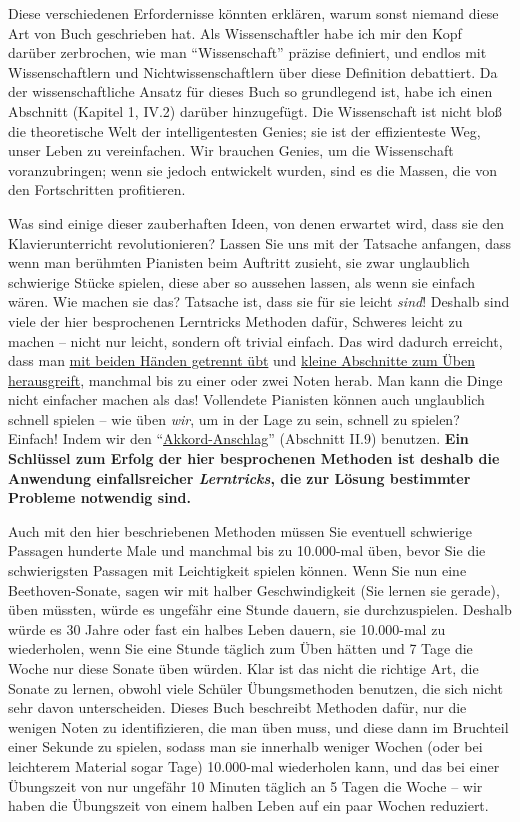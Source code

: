 Diese verschiedenen Erfordernisse könnten erklären, warum sonst niemand diese Art von Buch geschrieben hat.
Als Wissenschaftler habe ich mir den Kopf darüber zerbrochen, wie man \enquote{Wissenschaft} präzise definiert, und endlos mit Wissenschaftlern und Nichtwissenschaftlern über diese Definition debattiert.
Da der wissenschaftliche Ansatz für dieses Buch so grundlegend ist, habe ich einen Abschnitt (Kapitel 1, IV.2) darüber hinzugefügt.
Die Wissenschaft ist nicht bloß die theoretische Welt der intelligentesten Genies; sie ist der effizienteste Weg, unser Leben zu vereinfachen.
Wir brauchen Genies, um die Wissenschaft voranzubringen; wenn sie jedoch entwickelt wurden, sind es die Massen, die von den Fortschritten profitieren.

Was sind einige dieser zauberhaften Ideen, von denen erwartet wird, dass sie den Klavierunterricht revolutionieren?
Lassen Sie uns mit der Tatsache anfangen, dass wenn man berühmten Pianisten beim Auftritt zusieht, sie zwar unglaublich schwierige Stücke spielen, diese aber so aussehen lassen, als wenn sie einfach wären.
Wie machen sie das?
Tatsache ist, dass sie für sie leicht \textit{sind}!
Deshalb sind viele der hier besprochenen Lerntricks Methoden dafür, Schweres leicht zu machen -- nicht nur leicht, sondern oft trivial einfach.
Das wird dadurch erreicht, dass man \hyperref[c1ii7]{mit beiden Händen getrennt übt} und \hyperref[c1ii6]{kleine Abschnitte zum Üben herausgreift}, manchmal bis zu einer oder zwei Noten herab.
Man kann die Dinge nicht einfacher machen als das!
Vollendete Pianisten können auch unglaublich schnell spielen -- wie üben \textit{wir}, um in der Lage zu sein, schnell zu spielen?
Einfach!
Indem wir den \enquote{\hyperref[c1ii9]{Akkord-Anschlag}} (Abschnitt II.9) benutzen.
\textbf{Ein Schlüssel zum Erfolg der hier besprochenen Methoden ist deshalb die Anwendung einfallsreicher \textit{Lerntricks}, die zur Lösung bestimmter Probleme notwendig sind.}

Auch mit den hier beschriebenen Methoden müssen Sie eventuell schwierige Passagen hunderte Male und manchmal bis zu 10.000-mal üben, bevor Sie die schwierigsten Passagen mit Leichtigkeit spielen können.
Wenn Sie nun eine Beethoven-Sonate, sagen wir mit halber Geschwindigkeit (Sie lernen sie gerade), üben müssten, würde es ungefähr eine Stunde dauern, sie durchzuspielen.
Deshalb würde es 30 Jahre oder fast ein halbes Leben dauern, sie 10.000-mal zu wiederholen, wenn Sie eine Stunde täglich zum Üben hätten und 7 Tage die Woche nur diese Sonate üben würden.
Klar ist das nicht die richtige Art, die Sonate zu lernen, obwohl viele Schüler Übungsmethoden benutzen, die sich nicht sehr davon unterscheiden.
Dieses Buch beschreibt Methoden dafür, nur die wenigen Noten zu identifizieren, die man üben muss, und diese dann im Bruchteil einer Sekunde zu spielen, sodass man sie innerhalb weniger Wochen (oder bei leichterem Material sogar Tage) 10.000-mal wiederholen kann, und das bei einer Übungszeit von nur ungefähr 10 Minuten täglich an 5 Tagen die Woche -- wir haben die Übungszeit von einem halben Leben auf ein paar Wochen reduziert.

